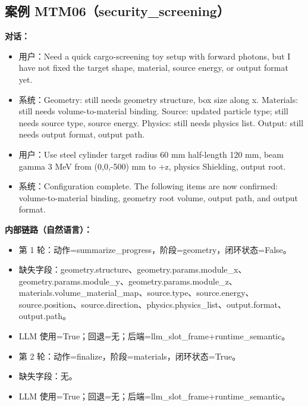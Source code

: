 \documentclass[11pt]{ctexart}
\begin{document}
\subsection{案例 MTM06（security\_screening）}
\textbf{对话：}
\begin{itemize}
\item 用户：Need a quick cargo-screening toy setup with forward photons, but I have not fixed the target shape, material, source energy, or output format yet.
\item 系统：Geometry: still needs geometry structure, box size along x. Materials: still needs volume-to-material binding. Source: updated particle type; still needs source type, source energy. Physics: still needs physics list. Output: still needs output format, output path.
\item 用户：Use steel cylinder target radius 60 mm half-length 120 mm, beam gamma 3 MeV from (0,0,-500) mm to +z, physics Shielding, output root.
\item 系统：Configuration complete. The following items are now confirmed: volume-to-material binding, geometry root volume, output path, and output format.
\end{itemize}
\textbf{内部链路（自然语言）：}
\begin{itemize}
\item 第 1 轮：动作=summarize\_progress，阶段=geometry，闭环状态=False。
\item 缺失字段：geometry.structure、geometry.params.module\_x、geometry.params.module\_y、geometry.params.module\_z、materials.volume\_material\_map、source.type、source.energy、source.position、source.direction、physics.physics\_list、output.format、output.path。
\item LLM 使用=True；回退=无；后端=llm\_slot\_frame+runtime\_semantic。
\item 第 2 轮：动作=finalize，阶段=materials，闭环状态=True。
\item 缺失字段：无。
\item LLM 使用=True；回退=无；后端=llm\_slot\_frame+runtime\_semantic。
\end{itemize}
\end{document}

